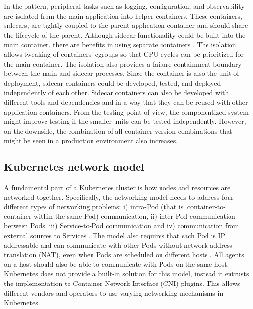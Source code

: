 \documentclass[english, 12pt, a4paper, sci, utf8, a-2b, online]{aaltothesis}
\begin{document}
In the pattern, peripheral tasks such as logging, configuration, and observability are isolated from the main application into helper containers.
These containers, sidecars, are tightly-coupled to the parent application container and should share the lifecycle of the parent.
Although sidecar functionality could be built into the main container, there are benefits in using separate containers \cite{burns2016design}.
The isolation allows tweaking of containers' cgroups so that CPU cycles can be prioritized for the main container.
The isolation also provides a failure containment boundary between the main and sidecar processes.
Since the container is also the unit of deployment, sidecar containers could be developed, tested, and deployed independently of each other.
Sidecar containers can also be developed with different tools and dependencies and in a way that they can be reused with other application containers.
From the testing point of view, the componentized system might improve testing if the smaller units can be tested independently.
However, on the downside, the combination of all container version combinations that might be seen in a production environment also increases.

\subsection{Kubernetes network model}



A fundamental part of a Kubernetes cluster is how nodes and resources are networked together.
Specifically, the networking model needs to address four different types of networking problems: i) intra-Pod (that is, container-to-container within the same Pod) communication, ii) inter-Pod communication between Pods, iii) Service-to-Pod communication and iv) communication from external sources to Services \cite{k8s-docs-cluster-networking}.
The model also requires that each Pod is IP addressable and can communicate with other Pods without network address translation (NAT), even when Pods are scheduled on different hosts \cite{qi2020assessing}.
All agents on a host should also be able to communicate with Pods on the same host.
Kubernetes does not provide a built-in solution for this model, instead it entrusts the implementation to Container Network Interface (CNI) plugins.
This allows different vendors and operators to use varying networking mechanisms in Kubernetes.
\end{document}
